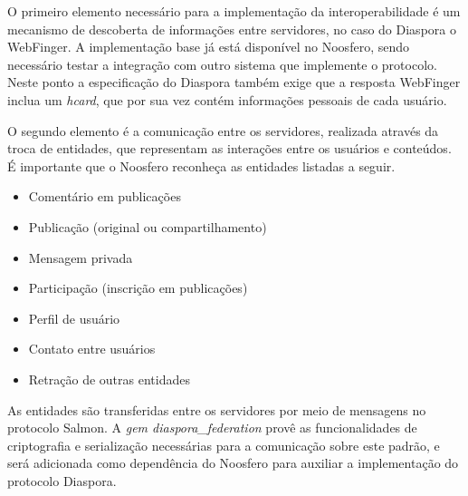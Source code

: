 
O primeiro elemento necessário para a implementação da interoperabilidade é um
mecanismo de descoberta de informações entre servidores, no caso do Diaspora o
WebFinger. A implementação base já está disponível no Noosfero, sendo necessário
testar a integração com outro sistema que implemente o protocolo. Neste ponto a
especificação do Diaspora também exige que a resposta WebFinger inclua um
\textit{hcard}, que por sua vez contém informações pessoais de cada usuário.

O segundo elemento é a comunicação entre os servidores, realizada através da troca
de entidades, que representam as interações entre os usuários e conteúdos. É
importante que o Noosfero reconheça as entidades listadas a seguir.

\begin{itemize}
  \item{Comentário em publicações}
  \item{Publicação (original ou compartilhamento)}
  \item{Mensagem privada}
  \item{Participação (inscrição em publicações)}
  \item{Perfil de usuário}
  \item{Contato entre usuários}
  \item{Retração de outras entidades}
\end{itemize}

As entidades são transferidas entre os servidores por meio de mensagens no protocolo
Salmon. A \textit{gem diaspora_federation} provê as funcionalidades de criptografia
e serialização necessárias para a comunicação sobre este padrão, e será adicionada
como dependência do Noosfero para auxiliar a implementação do protocolo Diaspora.
